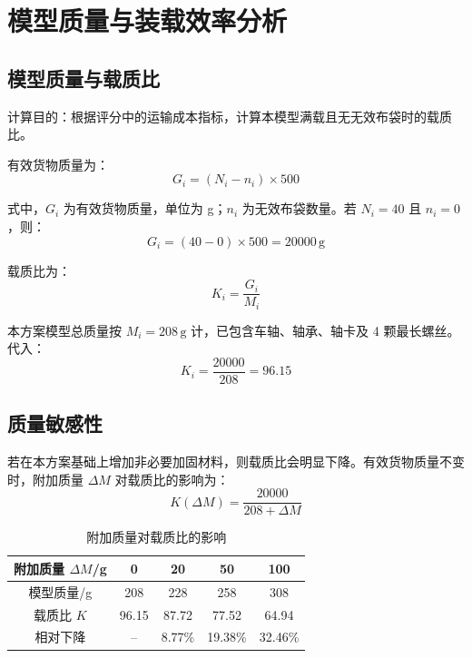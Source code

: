 \documentclass[UTF8,a4paper,12pt,fontset=none]{ctexart}
\numberwithin{equation}{section}
\numberwithin{figure}{section}
\numberwithin{table}{section}
\newcommand{\g}{\,\mathrm{g}}
\begin{document}
\newpage
\section{模型质量与装载效率分析}

\subsection{模型质量与载质比}
计算目的：根据评分中的运输成本指标，计算本模型满载且无无效布袋时的载质比。

有效货物质量为：
\begin{equation}
  G_i=(N_i-n_i)\times500
\end{equation}

式中，$G_i$ 为有效货物质量，单位为 g；$n_i$ 为无效布袋数量。若 $N_i=40$ 且 $n_i=0$，则：
\begin{equation}
  G_i=(40-0)\times500=20000\g
\end{equation}

载质比为：
\begin{equation}
  K_i=\frac{G_i}{M_i}
\end{equation}

本方案模型总质量按 $M_i=208\g$ 计，已包含车轴、轴承、轴卡及 4 颗最长螺丝。代入：
\begin{equation}
  K_i=\frac{20000}{208}=96.15
\end{equation}

\subsection{质量敏感性}
若在本方案基础上增加非必要加固材料，则载质比会明显下降。有效货物质量不变时，附加质量 $\Delta M$ 对载质比的影响为：
\begin{equation}
  K(\Delta M)=\frac{20000}{208+\Delta M}
\end{equation}

\begin{table}[H]
\centering
\caption{附加质量对载质比的影响}
\label{tab:mass-sensitivity}
\begin{tabular}{c c c c c}
\toprule
\textbf{附加质量 $\Delta M$}/g & \textbf{0} & \textbf{20} & \textbf{50} & \textbf{100} \\\midrule
模型质量/g & 208 & 228 & 258 & 308 \\
载质比 $K$ & 96.15 & 87.72 & 77.52 & 64.94 \\
相对下降 & -- & 8.77\% & 19.38\% & 32.46\% \\
\bottomrule
\end{tabular}
\end{table}
\end{document}
